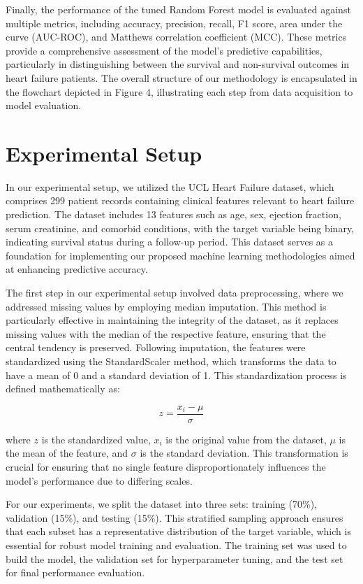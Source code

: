 \documentclass{article}
\begin{document}
Finally, the performance of the tuned Random Forest model is evaluated against multiple metrics, including accuracy, precision, recall, F1 score, area under the curve (AUC-ROC), and Matthews correlation coefficient (MCC). These metrics provide a comprehensive assessment of the model's predictive capabilities, particularly in distinguishing between the survival and non-survival outcomes in heart failure patients. The overall structure of our methodology is encapsulated in the flowchart depicted in Figure 4, illustrating each step from data acquisition to model evaluation.

\section{Experimental Setup}
In our experimental setup, we utilized the UCL Heart Failure dataset, which comprises 299 patient records containing clinical features relevant to heart failure prediction. The dataset includes 13 features such as age, sex, ejection fraction, serum creatinine, and comorbid conditions, with the target variable being binary, indicating survival status during a follow-up period. This dataset serves as a foundation for implementing our proposed machine learning methodologies aimed at enhancing predictive accuracy.

The first step in our experimental setup involved data preprocessing, where we addressed missing values by employing median imputation. This method is particularly effective in maintaining the integrity of the dataset, as it replaces missing values with the median of the respective feature, ensuring that the central tendency is preserved. Following imputation, the features were standardized using the StandardScaler method, which transforms the data to have a mean of 0 and a standard deviation of 1. This standardization process is defined mathematically as:

\[
z = \frac{x_i - \mu}{\sigma}
\]

where \( z \) is the standardized value, \( x_i \) is the original value from the dataset, \( \mu \) is the mean of the feature, and \( \sigma \) is the standard deviation. This transformation is crucial for ensuring that no single feature disproportionately influences the model's performance due to differing scales.

For our experiments, we split the dataset into three sets: training (70\%), validation (15\%), and testing (15\%). This stratified sampling approach ensures that each subset has a representative distribution of the target variable, which is essential for robust model training and evaluation. The training set was used to build the model, the validation set for hyperparameter tuning, and the test set for final performance evaluation.
\end{document}
